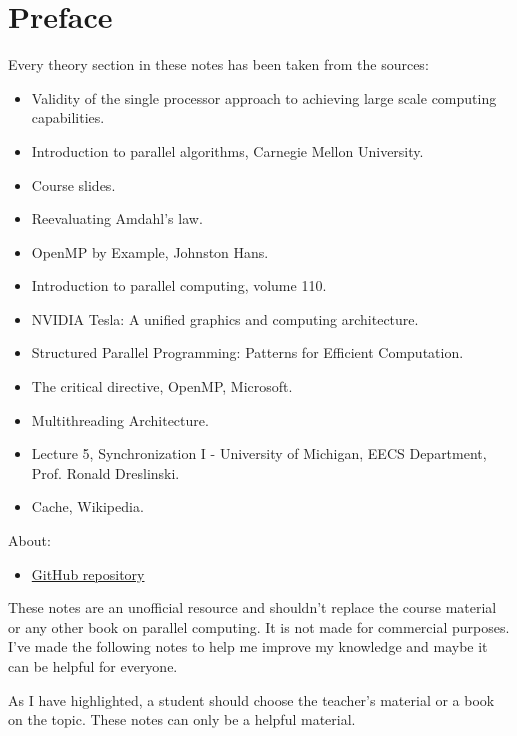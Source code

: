 \section*{Preface}

Every theory section in these notes has been taken from the sources:
\begin{itemize}
    \item Validity of the single processor approach to achieving large scale computing capabilities.\cite{amdahl2007validity}
    \item Introduction to parallel algorithms, Carnegie Mellon University.\cite{introductionToParallelAlgorithmsUMD}
    \item Course slides.\cite{parallel-computing-polimi}
    \item Reevaluating Amdahl's law.\cite{gustafson1988reevaluating}
    \item OpenMP by Example, Johnston Hans.\cite{whatIsOpenMPumassJohnstonHans}
    \item Introduction to parallel computing, volume 110.\cite{kumar1994introduction}
    \item NVIDIA Tesla: A unified graphics and computing architecture.\cite{lindholm2008nvidia}
    \item Structured Parallel Programming: Patterns for Efficient Computation.\cite{mccool2012structured}
    \item The critical directive, OpenMP, Microsoft.\cite{openMPCriticalDirectiveMicrosoftExample}
    \item Multithreading Architecture.\cite{nemirovsky2022multithreading}
    \item Lecture 5, Synchronization I - University of Michigan, EECS Department, Prof. Ronald Dreslinski.\cite{EECS570Lecture5ZeroOverheadWarpScheduling}
    \item Cache, Wikipedia.\cite{wikipediaCacheResearch}
\end{itemize}
About:
\begin{itemize}
    \item[\faIcon{github}] \href{https://github.com/PoliMI-HPC-E-notes-projects-AndreVale69/HPC-E-PoliMI-university-notes}{GitHub repository}
\end{itemize}
These notes are an unofficial resource and shouldn't replace the course material or any other book on parallel computing. It is not made for commercial purposes. I've made the following notes to help me improve my knowledge and maybe it can be helpful for everyone.

As I have highlighted, a student should choose the teacher's material or a book on the topic. These notes can only be a helpful material.